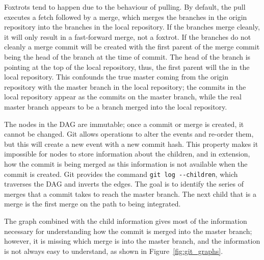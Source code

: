 Foxtrots tend to happen due to the behaviour of pulling.
By default, the pull executes a fetch followed by a merge, which merges
the branches in the origin repository into the branches in the local
repository.
If the branches merge cleanly, it will only result in a fast-forward
merge, not a foxtrot.
If the branches do not cleanly a merge commit will be created with the
first parent of the merge commit being the head of the branch at the
time of commit.
The head of the branch is pointing at the top of the
local repository, thus, the first parent will the in the local
repository.
This confounds the true master coming from the origin repository with
the master branch in the local repository; the commits in the local
repository appear as the commits on the master branch, while the real
master branch appears to be a branch merged into the local repository.

The nodes in the DAG are immutable; once a commit or merge is created,
it cannot be changed. Git allows operations to alter the events and
re-order them, but this will create a new event with a new commit hash.
This property makes it impossible for nodes to store information about
the children, and in extension, how the commit is being merged as this
information is not available when the commit is created.
Git provides the command \verb|git log --children|, which traverses the
DAG and inverts the edges.
The goal is to identify the series of merges that a commit takes to
reach the master branch.
The next child that is a merge is the first merge on the path to being
integrated.

The graph combined with the child information gives most of the
information necessary for understanding how the commit is
merged into the master branch; however, it is missing which merge is
into the master branch, and the information is not always easy to
understand, as shown in Figure~\ref{fig:git_graphs}.

